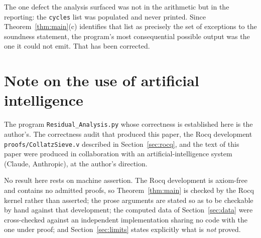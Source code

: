 \documentclass[11pt,a4paper]{article}
\theoremstyle{plain}
\theoremstyle{definition}
\begin{document}
The one defect the analysis surfaced was not in the arithmetic but in the
reporting: the \texttt{cycles} list was populated and never printed. Since
Theorem~\ref{thm:main}(c) identifies that list as precisely the set of
exceptions to the soundness statement, the program's most consequential
possible output was the one it could not emit. That has been corrected.

\section*{Note on the use of artificial intelligence}
\label{sec:ai}

The program \texttt{Residual\_Analysis.py} whose correctness is established here is the author's.
The correctness audit that produced this paper, the Rocq development
\texttt{proofs/CollatzSieve.v} described in Section~\ref{sec:rocq}, and the text of this paper were
produced in collaboration with an artificial-intelligence system (Claude, Anthropic), at the
author's direction.

No result here rests on machine assertion. The Rocq development is axiom-free and contains no
admitted proofs, so Theorem~\ref{thm:main} is checked by the Rocq kernel rather than asserted; the
prose arguments are stated so as to be checkable by hand against that development; the computed
data of Section~\ref{sec:data} were cross-checked against an independent implementation sharing no
code with the one under proof; and Section~\ref{sec:limits} states explicitly what is \emph{not}
proved.
\end{document}
